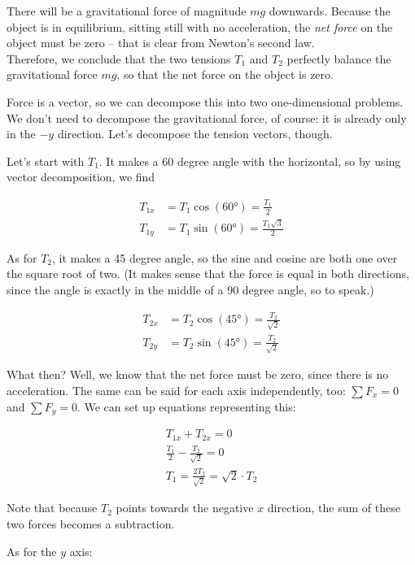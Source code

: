 There will be a gravitational force of magnitude $m g$ downwards. Because the object is in equilibrium, sitting still with no acceleration, the \emph{net force} on the object must be zero -- that is clear from Newton's second law.\\
Therefore, we conclude that the two tensions $T_1$ and $T_2$ perfectly balance the gravitational force $m g$, so that the net force on the object is zero.

Force is a vector, so we can decompose this into two one-dimensional problems. We don't need to decompose the gravitational force, of course: it is already only in the $-y$ direction. Let's decompose the tension vectors, though.

Let's start with $T_1$. It makes a 60 degree angle with the horizontal, so by using vector decomposition, we find

\begin{align}
T_{1x} &= T_1 \cos(\ang{60}) = \frac{T_1}{2}\\
T_{1y} &= T_1 \sin(\ang{60}) = \frac{T_1 \sqrt{3}}{2}
\end{align}

As for $T_2$, it makes a 45 degree angle, so the sine and cosine are both one over the square root of two. (It makes sense that the force is equal in both directions, since the angle is exactly in the middle of a 90 degree angle, so to speak.)

\begin{align}
T_{2x} &= T_2 \cos(\ang{45}) = \frac{T_2}{\sqrt{2}}\\
T_{2y} &= T_2 \sin(\ang{45}) = \frac{T_2}{\sqrt{2}}
\end{align}

What then? Well, we know that the net force must be zero, since there is no acceleration. The same can be said for each axis independently, too: $\sum F_x = 0$ and $\sum F_y = 0$. We can set up equations representing this:

\begin{align}
T_{1x} + T_{2x} = 0\\
\frac{T_1}{2} - \frac{T_2}{\sqrt{2}} = 0\\
T_1 = \frac{2 T_2}{\sqrt{2}} = \sqrt{2} \cdot T_2 \label{eq:lec6_t1}
\end{align}

Note that because $T_2$ points towards the negative $x$ direction, the sum of these two forces becomes a subtraction.

As for the $y$ axis:

